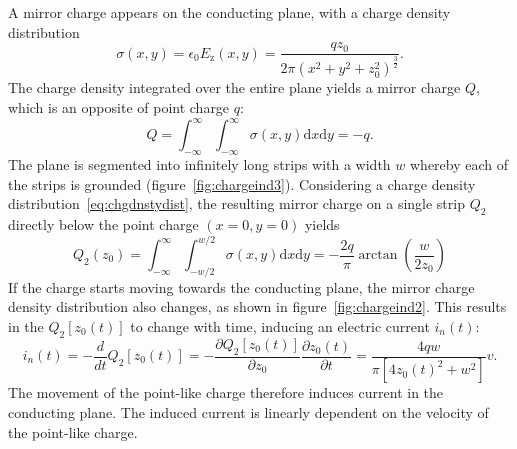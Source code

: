 A mirror charge appears on the conducting plane, with a charge density distribution
\begin{equation}
\label{eq:chgdnstydist}
\sigma(x,y)=\epsilon_\mathrm{0}E_\mathrm{z}(x,y)=\frac{qz_\mathrm{0}}{2\pi(x^2+y^2+z_0^2)^\frac{3}{2}}.
\end{equation}
The charge density integrated over the entire plane yields a mirror charge $Q$, which is an opposite of point charge $q$:
\begin{equation}
\label{eq:chargedensity}
Q=\int_{-\infty}^{\infty} \int_{-\infty}^{\infty} \sigma(x,y)\mathrm{d}x\mathrm{d}y = -q.
\end{equation}
The plane is segmented into infinitely long strips with a width $w$ whereby each of the strips is grounded (figure~\ref{fig:chargeind3}). Considering a charge density distribution~\ref{eq:chgdnstydist}, the resulting mirror charge on a single strip $Q_\mathrm{2}$ directly below the point charge $(x=0, y=0)$ yields
\begin{equation}
\label{eq:stripcharge}
Q_\mathrm{2}(z_\mathrm{0})=\int_{-\infty}^{\infty}\int_{-w/2}^{w/2}\sigma(x,y)\mathrm{d}x\mathrm{d}y = -\frac{2q}{\pi}\arctan\left(\frac{w}{2z_\mathrm{0}}\right)
\end{equation} 
If the charge starts moving towards the conducting plane, the mirror charge density distribution also changes, as shown in figure~\ref{fig:chargeind2}. This results in the $Q_2[z_0(t)]$ to change with time, inducing an electric current $i_n(t)$:
 \begin{equation}
 \label{eq:indcurr}
 i_n(t) = -\frac{d}{dt}Q_\mathrm{2}[z_\mathrm{0}(t)] = -\frac{\partial Q_\mathrm{2}[z_\mathrm{0}(t)]}{\partial z_\mathrm{0}}\frac{\partial z_\mathrm{0}(t)}{\partial t} = \frac{4qw}{\pi[4z_\mathrm{0}(t)^2 + w^2]}v. 
 \end{equation}
 The movement of the point-like charge therefore induces current in the conducting plane. The induced current is linearly dependent on the velocity of the point-like charge.

